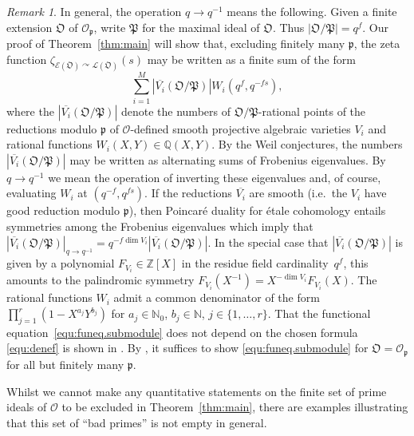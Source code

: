 \documentclass[11pt]{amsart}
\numberwithin{equation}{section}
\numberwithin{figure}{section}
\theoremstyle{plain}
\theoremstyle{definition}
\theoremstyle{remark}
\newtheorem{remark}[theorem]{Remark}
\begin{document}
\begin{remark}\label{rem:invert}
  In general, the operation $q{\rightarrow} q^{-1}$ means the following. Given
  a finite extension ${\mathfrak O}$ of ${\ensuremath{\mathcal{O}}}_{\mathfrak{p}}$, write ${\mathfrak{P}}$ for the
  maximal ideal of ${\mathfrak O}$. Thus $|{\mathfrak O} / {\mathfrak{P}}| = q^f$. Our proof of
  Theorem~\ref{thm:main} will show that, excluding finitely many
  ${\mathfrak{p}}$, the zeta function $\zeta_{{\mathcal{E}}({\mathfrak O}) {\curvearrowright} {\ensuremath{\mathcal{L}}}({\mathfrak O})}(s)$
  may be written as a finite sum of the form
\begin{equation}\label{equ:denef}
\sum_{i=1}^M |\overline{V_i}({\mathfrak O}/{\mathfrak{P}})| W_i(q^f,q^{-fs}),
\end{equation}
where the $|\overline{V_i}({\mathfrak O}/{\mathfrak{P}})|$ denote the numbers of
${\mathfrak O}/{\mathfrak{P}}$-rational points of the reductions modulo ${\mathfrak{p}}$ of
${\ensuremath{\mathcal{O}}}$-defined smooth projective algebraic varieties $V_i$ and
rational functions $W_i(X,Y)\in{\ensuremath{\mathbb{Q}}}(X,Y)$.  By the Weil conjectures, the
numbers $|\overline{V_i}({\mathfrak O}/{\mathfrak{P}})|$ may be written as alternating
sums of Frobenius eigenvalues. By $q{\rightarrow} q^{-1}$ we mean the
operation of inverting these eigenvalues and, of course, evaluating
$W_i$ at $(q^{-f},q^{fs})$. If the reductions $\overline{V_i}$ are
smooth (i.e.\ the $V_i$ have good reduction modulo ${\mathfrak{p}}$), then
Poincar\'e duality for \'etale cohomology entails symmetries among the
Frobenius eigenvalues which imply that
$|\overline{V_i}({\mathfrak O}/{\mathfrak{P}})|_{q{\rightarrow} q^{-1}} = q^{-f\dim V_i}
|\overline{V_i}({\mathfrak O}/{\mathfrak{P}})|$. In the special case that
$|\overline{V_i}({\mathfrak O}/{\mathfrak{P}})|$ is given by a polynomial
$F_{V_i}\in{\ensuremath{\mathbb{Z}}}[X]$ in the residue field cardinality~$q^f$, this amounts
to the palindromic symmetry $F_{V_i}(X^{-1}) = X^{-\dim
  V_i}F_{V_i}(X)$. The rational functions $W_i$ admit a common
denominator of the form $\prod_{j=1}^r(1-X^{a_j}Y^{b_j})$ for
$a_j\in{\ensuremath{\mathbb{N}}}_0$, $b_j\in{\ensuremath{\mathbb{N}}}$, $j\in\{1,\dots,r \}$. That the functional
equation~\eqref{equ:funeq.submodule} does not depend on the chosen
formula \eqref{equ:denef} is shown in
\cite[Section~5]{Rossmann/15a}. By \cite[Corollary~5.3]{Rossmann/15a},
it suffices to show \eqref{equ:funeq.submodule} for ${\mathfrak O}={\ensuremath{\mathcal{O}}}_{\mathfrak{p}}$
for all but finitely many ${\mathfrak{p}}$.

Whilst we cannot make any quantitative statements on the finite set of
prime ideals of ${\ensuremath{\mathcal{O}}}$ to be excluded in Theorem~\ref{thm:main}, there
are examples illustrating that this set of ``bad primes'' is not empty
in general.
\end{remark}
\end{document}
